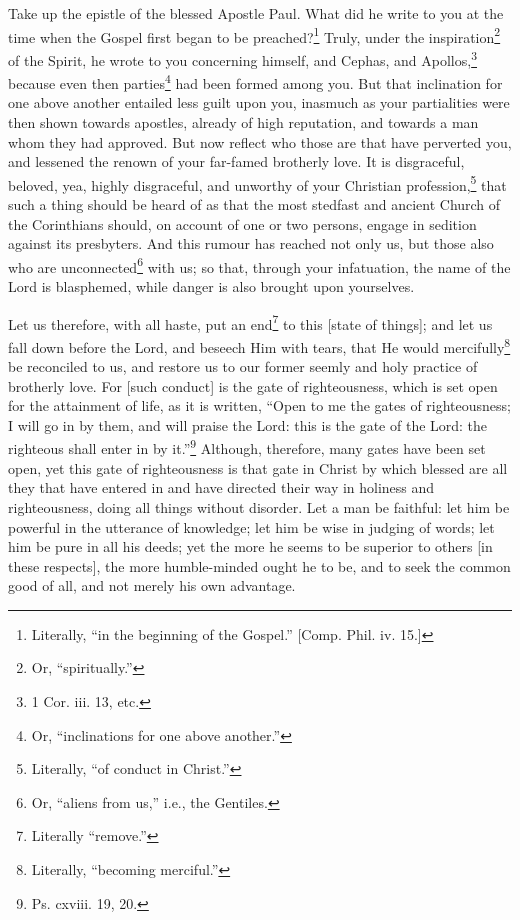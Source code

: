 Take up the epistle of the blessed Apostle Paul. What did he write to you at the time when the Gospel first began to be preached?\footnote{Literally, “in the beginning of the Gospel.” [Comp. Phil. iv. 15.]} Truly, under the inspiration\footnote{Or, “spiritually.”} of the Spirit, he wrote to you concerning himself, and Cephas, and Apollos,\footnote{1 Cor. iii. 13, etc.} because even then parties\footnote{Or, “inclinations for one above another.”} had been formed among you. But that inclination for one above another entailed less guilt upon you, inasmuch as your partialities were then shown towards apostles, already of high reputation, and towards a man whom they had approved. But now reflect who those are that have perverted you, and lessened the renown of your far-famed brotherly love. It is disgraceful, beloved, yea, highly disgraceful, and unworthy of your Christian profession,\footnote{Literally, “of conduct in Christ.”} that such a thing should be heard of as that the most stedfast and ancient Church of the Corinthians should, on account of one or two persons, engage in sedition against its presbyters. And this rumour has reached not only us, but those also who are unconnected\footnote{Or, “aliens from us,” i.e., the Gentiles.} with us; so that, through your infatuation, the name of the Lord is blasphemed, while danger is also brought upon yourselves.


Let us therefore, with all haste, put an end\footnote{Literally “remove.”} to this [state of things]; and let us fall down before the Lord, and beseech Him with tears, that He would mercifully\footnote{Literally, “becoming merciful.”} be reconciled to us, and restore us to our former seemly and holy practice of brotherly love. For [such conduct] is the gate of righteousness, which is set open for the attainment of life, as it is written, “Open to me the gates of righteousness; I will go in by them, and will praise the Lord: this is the gate of the Lord: the righteous shall enter in by it.”\footnote{Ps. cxviii. 19, 20.} Although, therefore, many gates have been set open, yet this gate of righteousness is that gate in Christ by which blessed are all they that have entered in and have directed their way in holiness and righteousness, doing all things without disorder. Let a man be faithful: let him be powerful in the utterance of knowledge; let him be wise in judging of words; let him be pure in all his deeds; yet the more he seems to be superior to others [in these respects], the more humble-minded ought he to be, and to seek the common good of all, and not merely his own advantage.

